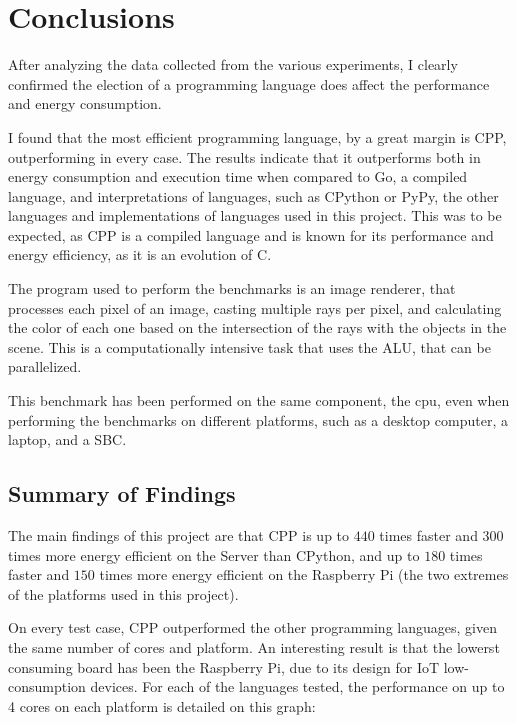 \chapter{Conclusions}\label{chap:conclusions}

After analyzing the data collected from the various experiments, I clearly confirmed the election of a programming language does affect the performance and energy consumption. 

I found that the most efficient programming language, by a great margin is \gls{CPP}, outperforming in every case. The results indicate that it outperforms both in energy consumption and execution time when compared to Go, a compiled language, and interpretations of languages, such as \gls{CPython} or PyPy, the other languages and implementations of languages used in this project. This was to be expected, as \gls{CPP} is a compiled language and is known for its performance and energy efficiency, as it is an evolution of C.

The program used to perform the benchmarks is an image renderer, that processes each pixel of an image, casting multiple rays per pixel, and calculating the color of each one based on the intersection of the rays with the objects in the scene. This is a computationally intensive task that uses the \gls{ALU}, that can be parallelized.

This benchmark has been performed on the same component, the \gls{cpu}, even when performing the benchmarks on different platforms, such as a desktop computer, a laptop, and a \gls{SBC}.

\section{Summary of Findings}

The main findings of this project are that \gls{CPP} is up to $440$ times faster and $300$ times more energy efficient on the Server than \gls{CPython}, and up to $180$ times faster and $150$ times more energy efficient on the Raspberry Pi (the two extremes of the platforms used in this project). 

On every test case, \gls{CPP} outperformed the other programming languages, given the same number of cores and platform. An interesting result is that the lowerst consuming board has been the Raspberry Pi, due to its design for IoT low-consumption devices. For each of the languages tested, the performance on up to 4 cores on each platform is detailed on this graph:

